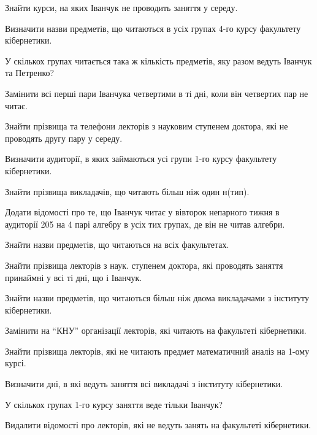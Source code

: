 \begin{card}
    \item Знайти курси, на яких Іванчук не проводить заняття у середу.
    \item Визначити назви предметів, що читаються в усіх групах 4-го курсу факультету кібернетики.
    \item У скількох групах читається така ж кількість предметів, яку разом ведуть Іванчук та Петренко?
    \item Замінити всі перші пари Іванчука четвертими в ті дні, коли він четвертих пар не читає.
\end{card}

\begin{card}
    \item Знайти прізвища та телефони лекторів з науковим ступенем доктора, які не проводять другу пару у середу.
    \item Визначити аудиторії, в яких займаються усі групи 1-го курсу факультету кібернетики.
    \item Знайти прізвища викладачів, що читають більш ніж один н (тип).
    \item Додати відомості про те, що Іванчук читає у вівторок непарного тижня в аудиторії 205 на 4 парі алгебру в усіх тих групах, де він не читав алгебри.
\end{card}

\begin{card}
    \item Знайти назви предметів, що читаються на всіх факультетах.
    \item Знайти прізвища лекторів з наук. ступенем доктора, які проводять заняття принаймні у всі ті дні, що і Іванчук.
    \item Знайти назви предметів, що читаються більш ніж двома викладачами з інституту кібернетики.
    \item Замінити на ``КНУ'' організації лекторів, які читають на факультеті кібернетики.
\end{card}

\begin{card}
    \item Знайти прізвища лекторів, які не читають предмет математичний аналіз на 1-ому курсі.
    \item Визначити дні, в які ведуть заняття всі викладачі з інституту кібернетики.
    \item У скількох групах 1-го курсу заняття веде тільки Іванчук?
    \item Видалити відомості про лекторів, які не ведуть занять на факультеті кібернетики.
\end{card}

